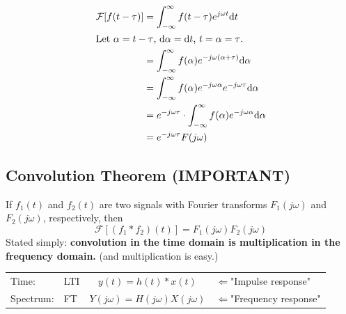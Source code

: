 \documentclass[10pt]{article}
\begin{document}
\begin{align*}
\mathcal{F}[f(t - \tau)] &= \int_{-\infty}^\infty f(t - \tau) e^{j\omega t} \text{d}t\\
\intertext{Let $\alpha = t - \tau$, $\text{d}\alpha = \text{d}t$, $t = \alpha = \tau$.}
&= \int_{-\infty}^\infty f(\alpha) e^{-j\omega(\alpha + \tau)} \text{d}\alpha\\
&= \int_{-\infty}^\infty f(\alpha) e^{-j\omega \alpha} e^{-j\omega \tau} \text{d}\alpha\\
&= e^{-j\omega \tau} \cdot \int_{-\infty}^\infty f(\alpha) e^{-j\omega \alpha} \text{d}\alpha\\
&= e^{-j\omega \tau} F(j\omega)
\end{align*}


\subsection*{Convolution Theorem (IMPORTANT)}
If $f_1(t)$ and $f_2(t)$ are two signals with Fourier transforms $F_1(j\omega)$ and $F_2(j\omega)$, respectively, then
\[\boxed{\mathcal{F}[(f_1 * f_2)(t)] = F_1(j\omega) F_2(j\omega)}\]
Stated simply: \textbf{convolution in the time domain is multiplication in the frequency domain.}  (and multiplication is easy.)\\

\begin{tabular}{llcl}
    Time: & LTI & $y(t) = h(t) * x(t)$ & $\Leftarrow$"Impulse response"\\
    Spectrum: & FT & \hspace{0.1cm}$Y(j\omega) = H(j\omega) X(j\omega)$ & $\Leftarrow$"Frequency response"
\end{tabular}
\end{document}

